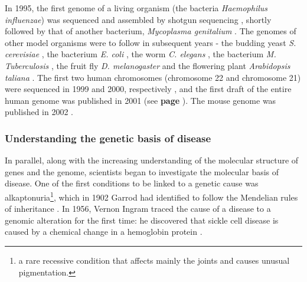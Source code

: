 


 
In 1995, the first genome of a living organism (the bacteria \textit{Haemophilus influenzae}) was sequenced and assembled by shotgun sequencing \cite{fleischmann1995whole}, shortly followed by that of another bacterium, \textit{Mycoplasma genitalium} \cite{fraser1995minimal}. 
The genomes of other model organisms were to follow in subsequent years - the budding yeast \textit{S. cerevisiae} \cite{goffeau1996life}, the bacterium \textit{E. coli} \cite{blattner1997complete}, the worm \textit{C. elegans} \cite{c1998genome}, the bacterium \textit{M. Tuberculosis} \cite{cole1998deciphering}, the fruit fly \textit{D. melanogaster} \cite{adams2000genome} and the flowering plant \textit{Arabidopsis taliana} \cite{kaul2000analysis}.
The first two human chromosomes (chromosome 22 and chromosome 21) were sequenced in 1999 and 2000, respectively \cite{dunham1999dna, hattori2000dna}, and the first draft of the entire human genome was published in 2001 \cite{lander2001initial, venter2001sequence} (see \textbf{page \pageref{sec:hgp}}).
The mouse genome was published in 2002 \cite{waterston2002initial}.

\subsubsection{Understanding the genetic basis of disease}
\label{sec:disease_genetic}

In parallel, along with the increasing understanding of the molecular structure of genes and the genome, scientists began to investigate the molecular basis of disease.
One of the first conditions to be linked to a genetic cause was alkaptonuria\footnote{a rare recessive condition that affects mainly the joints and causes unusual pigmentation.}, which in 1902 Garrod had identified  to follow the Mendelian rules of inheritance \cite{garrod1902incidence}.
In 1956, Vernon Ingram traced the cause of a disease to a genomic alteration for the first time: he discovered that sickle cell disease is caused by a chemical change in a hemoglobin protein \cite{ingram1963hemoglobins}.
\\

